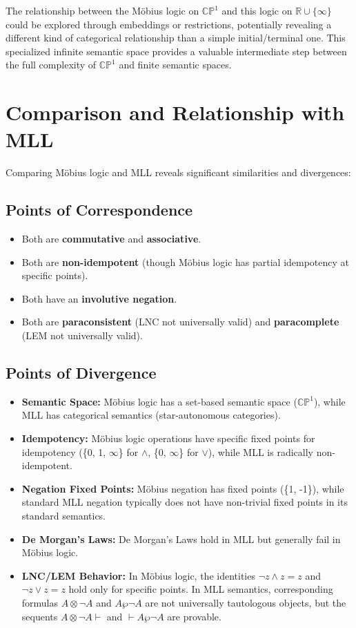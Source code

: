 \documentclass{article}
\begin{document}
	The relationship between the M\"{o}bius logic on $\mathbb{CP}^1$ and this logic on $\mathbb{R} \cup \{\infty\}$ could be explored through embeddings or restrictions, potentially revealing a different kind of categorical relationship than a simple initial/terminal one. This specialized infinite semantic space provides a valuable intermediate step between the full complexity of $\mathbb{CP}^1$ and finite semantic spaces.
	
	\section{Comparison and Relationship with MLL}
	
	Comparing M\"{o}bius logic and MLL reveals significant similarities and divergences:
	
	\subsection{Points of Correspondence}
	\begin{itemize}
		\item Both are \textbf{commutative} and \textbf{associative}.
		\item Both are \textbf{non-idempotent} (though M\"{o}bius logic has partial idempotency at specific points).
		\item Both have an \textbf{involutive negation}.
		\item Both are \textbf{paraconsistent} (LNC not universally valid) and \textbf{paracomplete} (LEM not universally valid).
	\end{itemize}
	
	\subsection{Points of Divergence}
	\begin{itemize}
		\item \textbf{Semantic Space:} M\"{o}bius logic has a set-based semantic space (\(\mathbb{CP}^1\)), while MLL has categorical semantics (star-autonomous categories).
		\item \textbf{Idempotency:} M\"{o}bius logic operations have specific fixed points for idempotency (\{0, 1, \(\infty\)\} for \(\wedge\), \{0, \(\infty\)\} for \(\vee\)), while MLL is radically non-idempotent.
		\item \textbf{Negation Fixed Points:} M\"{o}bius negation has fixed points (\{1, -1\}), while standard MLL negation typically does not have non-trivial fixed points in its standard semantics.
		\item \textbf{De Morgan's Laws:} De Morgan's Laws hold in MLL but generally fail in M\"{o}bius logic.
		\item \textbf{LNC/LEM Behavior:} In M\"{o}bius logic, the identities \(\neg z \wedge z = z\) and \(\neg z \vee z = z\) hold only for specific points. In MLL semantics, corresponding formulas \(A \otimes \neg A\) and \(A \wp \neg A\) are not universally tautologous objects, but the sequents $A \otimes \neg A \vdash$ and $\vdash A \wp \neg A$ are provable.
	\end{itemize}
	
\end{document}
